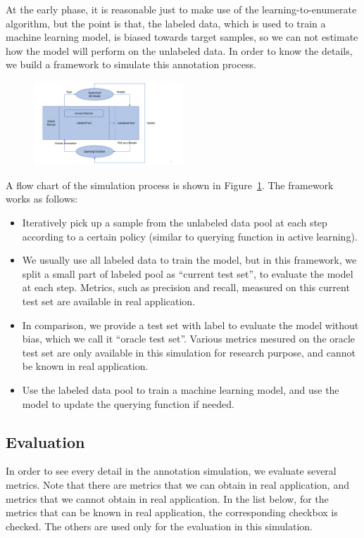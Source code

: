 \documentclass{deime}
\begin{document}
At the early phase, it is reasonable just to make use of the
learning-to-enumerate algorithm, but the point is that, the labeled
data, which is used to train a machine learning model, is biased
towards target samples, so we can not estimate how the model will
perform on the unlabeled data. In order to know the details, we build
a framework to simulate this annotation process.

\begin{figure}[!t]
\centering
\includegraphics[width=0.5\textwidth]{resource/structure}
\label{structure}
\end{figure}

A flow chart of the simulation process is shown in
Figure~\ref{structure}. The framework works as follows:
\begin{itemize}
\item Iteratively pick up a sample from the unlabeled data pool at
each step according to a certain policy (similar to querying function
in active learning).
\item We usually use all labeled data to train the model, but in this
framework, we split a small part of labeled pool as ``current test
set'', to evaluate the model at each step.  Metrics, such as precision
and recall, measured on this current test set are available in real
application.
\item In comparison, we provide a test set with label to evaluate the
model without bias, which we call it ``oracle test set''.  Various
metrics mesured on the oracle test set are only available in this
simulation for research purpose, and cannot be known in real
application.
\item Use the labeled data pool to train a machine learning model, and
use the model to update the querying function if needed.
\end{itemize}

\subsection{Evaluation}
In order to see every detail in the annotation simulation, we evaluate
several metrics. Note that there are metrics that we can obtain in
real application, and metrics that we cannot obtain in real
application.  In the list below, for the metrics that can be known in
real application, the corresponding checkbox is checked.  The others
are used only for the evaluation in this simulation.
\end{document}
